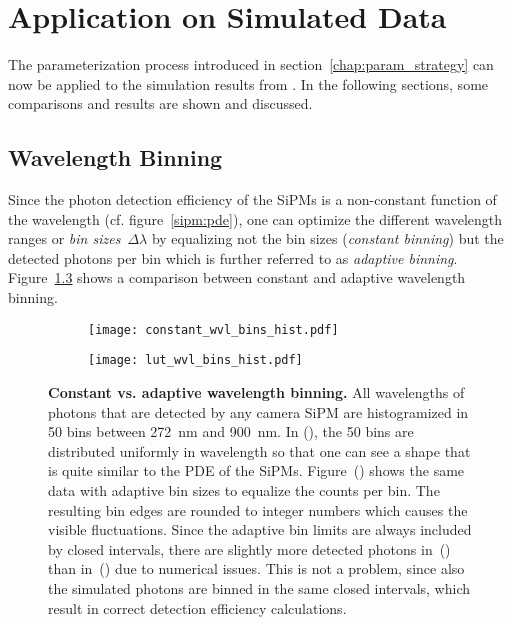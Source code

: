\chapter{Application on Simulated Data}

The parameterization process introduced in section~\ref{chap:param_strategy} can now be applied to the simulation results from \geant. In the following sections, some comparisons and results are shown and discussed.

\section{Wavelength Binning}\label{sec:wvl_binning}

Since the photon detection efficiency of the SiPMs is a non-constant function of the wavelength (cf. figure~\ref{sipm:pde}), one can optimize the different wavelength ranges or \textit{bin sizes}~$\Delta\lambda$ by equalizing not the bin sizes (\textit{constant binning}) but the detected photons per bin which is further referred to as \textit{adaptive binning}. Figure~\ref{param:wvl_binning} shows a comparison between constant and adaptive wavelength binning.

\begin{figure}[H]
	\centering
	\begin{subfigure}[t]{0.49\textwidth}
		\texttt{[image: constant\_wvl\_bins\_hist.pdf]}
		\label{param:wvl_binning:constant}
	\end{subfigure}
	\hfill
	\begin{subfigure}[t]{0.49\textwidth}
		\texttt{[image: lut\_wvl\_bins\_hist.pdf]}
		\label{param:wvl_binning:adaptive}
	\end{subfigure}
	\caption[Constant vs. adaptive wavelength binning]{\textbf{Constant vs. adaptive wavelength binning.} All wavelengths of photons that are detected by any camera SiPM are histogramized in \num{50} bins between \SI{272}{\nano\meter} and \SI{900}{\nano\meter}. In (), the \num{50} bins are distributed uniformly in wavelength so that one can see a shape that is quite similar to the PDE of the SiPMs. Figure~() shows the same data with adaptive bin sizes to equalize the counts per bin. The resulting bin edges are rounded to integer numbers which causes the visible fluctuations. Since the adaptive bin limits are always included by closed intervals, there are slightly more detected photons in~() than in~() due to numerical issues. This is not a problem, since also the simulated photons are binned in the same closed intervals, which result in correct detection efficiency calculations.}
	\label{param:wvl_binning}
\end{figure}

